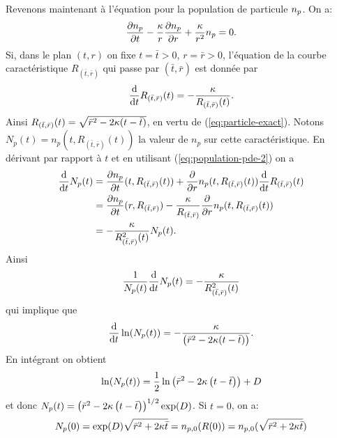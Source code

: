 Revenons maintenant à l'équation pour la population de particule
$n_p$. On a:
\begin{equation}\label{eq:population-pde-2}
  \frac{\partial n_p}{\partial t} -
  \frac{\kappa}{r}\frac{\partial n_p}{\partial r} +
  \frac{\kappa}{r^2}n_p = 0.
\end{equation}
\newcommand{\rcharacteristic}{R_{(\bar t, \bar r)}}
Si, dans le plan $(t, r)$ on fixe $t = \bar t > 0$, $r = \bar r > 0$,
l'équation de la courbe caractéristique $\rcharacteristic$ qui passe par $(\bar t,
\bar r)$ est donnée par
\begin{equation*}
\frac{\mathrm d}{\mathrm dt}R_{(\bar t, \bar r)}(t) =
-\frac{\kappa}{R_{(\bar t, \bar r)}(t)}.
\end{equation*}
Ainsi $R_{(\bar t, \bar r)}(t) = \sqrt{\bar r^2 - 2\kappa (t
  - \bar t)}$, en vertu de (\ref{eq:particle-exact}). Notons $N_p(t) =
n_p(t, R_{(\bar t, \bar r)}(t))$ la valeur de $n_p$ sur cette
caractéristique. En dérivant par rapport à $t$ et en utilisant
(\ref{eq:population-pde-2}) on a
\begin{align*}
  \frac{\mathrm d}{\mathrm dt}N_p(t) %
  &= \frac{\partial n_p}{\partial t}(t, \rcharacteristic(t)) %
  + \frac{\partial}{\partial r}n_p(t,\rcharacteristic(t)) %
    \frac{\mathrm d}{\mathrm dt}\rcharacteristic(t)\\
  &= \frac{\partial n_p}{\partial t}(r, \rcharacteristic) - \frac{\dissolutionrate}{\rcharacteristic}\frac{\partial}{\partial r} n_p(t, \rcharacteristic(t))\\
  &= -\frac{\dissolutionrate}{R_{(\bar t, \bar r)}^2(t)}N_p(t). %
\end{align*}
Ainsi
\begin{equation*}
  \frac{1}{N_p(t)}\frac{\mathrm d}{\mathrm dt}N_p(t) =
  -\frac{\kappa}{R^2_{(\bar t, \bar r)}(t)}
\end{equation*}
qui implique que
\begin{equation*}
  \frac{\mathrm d}{\mathrm dt}\ln(N_p(t)) =
  -\frac{\kappa}{\left( \bar r^2 - 2\kappa (t - \bar t) \right)}.
\end{equation*}
En intégrant on obtient
\begin{equation*}
  \ln(N_p(t)) = \frac{1}{2}\ln\left( \bar r^2 -
    2\kappa\left( t - \bar t \right) \right) + D
\end{equation*}
et donc
$N_p(t) = \left( \bar r^2 - 2\kappa\left( t - \bar t \right) \right)^{1/2} \exp(D)$. Si $t = 0$, on a:
\begin{equation*}
  N_p(0) = \exp(D)\sqrt{\bar r^2 +
    2\kappa \bar t} = n_{p,0}(R(0)) = n_{p,0}(\sqrt{\bar r^2 +
    2\kappa \bar t})
\end{equation*}
